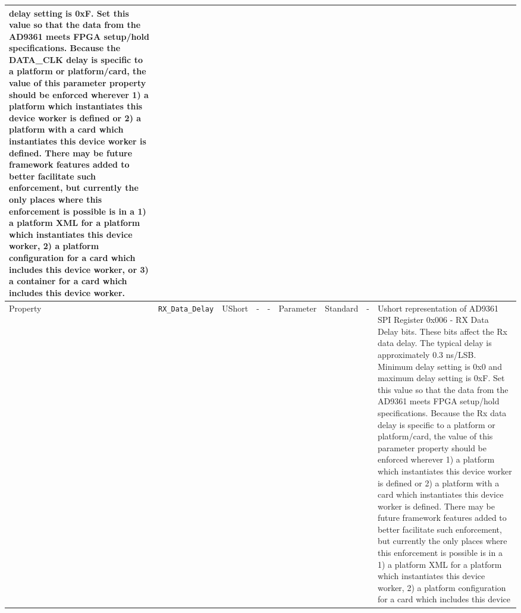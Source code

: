 \documentclass{article}
\begin{document}
\begin{landscape}
\begin{scriptsize}
\begin{longtable}{|p{2cm}|p{2.5cm}|p{1cm}|p{2cm}|p{2cm}|p{1.75cm}|p{2cm}|p{2.25cm}|p{5.04cm}|}
                         delay setting is 0xF. Set this value so that the
                         data from the AD9361 meets FPGA setup/hold
                         specifications.
                         Because the DATA\_CLK delay is specific to a platform or
                         platform/card, the value of this parameter property
                         should be enforced wherever 1) a platform which
                         instantiates this device worker is defined or 2) a
                         platform with a card which instantiates this device
                         worker is defined. There may be future framework
                         features added to better facilitate such enforcement,
                         but currently the only places where this enforcement is
                         possible is in a 1) a platform XML for a platform which
                         instantiates this device worker, 2) a platform
                         configuration for a card which includes this device
                         worker, or 3) a container for a card which includes
                         this device worker.
\\
			\hline
			Property     & \verb+RX_Data_Delay+ & UShort&-              & -               & Parameter     & Standard           & -       & 
Ushort representation of AD9361 SPI Register 0x006 -
                         RX Data Delay bits. These bits affect the
                         Rx data delay. The typical delay is approximately
                         0.3 ns/LSB. Minimum delay setting is 0x0 and maximum
                         delay setting is 0xF. Set this value so that the
                         data from the AD9361 meets FPGA setup/hold
                         specifications.
                         Because the Rx data delay is specific to a platform or
                         platform/card, the value of this parameter property
                         should be enforced wherever 1) a platform which
                         instantiates this device worker is defined or 2) a
                         platform with a card which instantiates this device
                         worker is defined. There may be future framework
                         features added to better facilitate such enforcement,
                         but currently the only places where this enforcement is
                         possible is in a 1) a platform XML for a platform which
                         instantiates this device worker, 2) a platform
                         configuration for a card which includes this device

\end{longtable}
\end{scriptsize}
\end{landscape}
\end{document}
